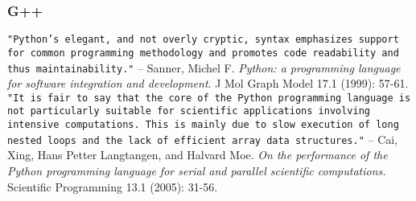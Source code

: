 \documentclass{article}
\begin{document}
\subsubsection{G++}

\begin{thebibliography}{9}
\texttt{"Python’s elegant, and not overly cryptic, syntax emphasizes support for common programming methodology and promotes code readability and thus maintainability."} -- Sanner, Michel F. \emph{Python: a programming language for software integration and development}. J Mol Graph Model 17.1 (1999): 57-61.
\texttt{"It is fair to say that the core of the Python programming language is not particularly suitable for scientific applications involving intensive computations. This is mainly due to slow execution of long nested loops and the lack of efficient array data structures."} -- Cai, Xing, Hans Petter Langtangen, and Halvard Moe. \emph{On the performance of the Python programming language for serial and parallel scientific computations.} Scientific Programming 13.1 (2005): 31-56.
\end{thebibliography}
\end{document}
